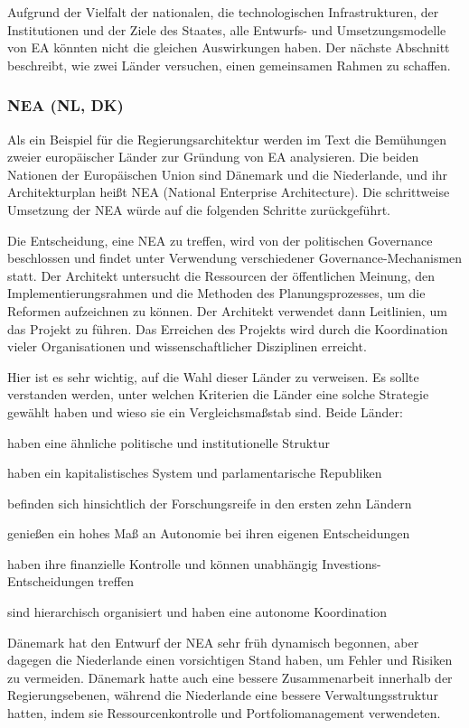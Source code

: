 \documentclass[
	doc,
	a4paper,
	helv
	]{apa6}
\begin{document}
Aufgrund der Vielfalt der nationalen, die technologischen Infrastrukturen, der Institutionen und der Ziele des Staates, alle Entwurfs- und Umsetzungsmodelle von EA könnten nicht die gleichen Auswirkungen haben. Der nächste Abschnitt beschreibt, wie zwei Länder versuchen, einen gemeinsamen Rahmen zu schaffen.

\subsubsection{NEA (NL, DK)}
Als ein Beispiel für die Regierungsarchitektur werden im Text die Bemühungen zweier europäischer Länder zur Gründung von EA analysieren. \autocite{Janssen2007} Die beiden Nationen der Europäischen Union sind Dänemark und die Niederlande, und ihr Architekturplan heißt NEA (National Enterprise Architecture). Die schrittweise Umsetzung der NEA würde auf die folgenden Schritte zurückgeführt.

Die Entscheidung, eine NEA zu treffen, wird von der politischen Governance beschlossen und findet unter Verwendung verschiedener Governance-Mechanismen statt. Der Architekt untersucht die Ressourcen der öffentlichen Meinung, den Implementierungsrahmen und die Methoden des Planungsprozesses, um die Reformen aufzeichnen zu können. Der Architekt verwendet dann Leitlinien, um das Projekt zu führen. Das Erreichen des Projekts wird durch die Koordination vieler Organisationen und wissenschaftlicher Disziplinen erreicht.

Hier ist es sehr wichtig, auf die Wahl dieser Länder zu verweisen. Es sollte verstanden werden, unter welchen Kriterien die Länder eine solche Strategie gewählt haben und wieso sie ein Vergleichsmaßstab sind.
Beide Länder:
\begin{APAitemize}
\item haben eine ähnliche politische und institutionelle Struktur
\item haben ein kapitalistisches System und parlamentarische Republiken
\item befinden sich hinsichtlich der Forschungsreife in den ersten zehn Ländern
\item genießen ein hohes Maß an Autonomie bei ihren eigenen Entscheidungen
\item haben ihre finanzielle Kontrolle und können unabhängig Investions-Entscheidungen treffen
\item sind hierarchisch organisiert und haben eine autonome Koordination
\end{APAitemize}
Dänemark hat den Entwurf der NEA sehr früh dynamisch begonnen, aber dagegen die Niederlande einen vorsichtigen Stand haben, um Fehler und Risiken zu vermeiden. Dänemark hatte auch eine bessere Zusammenarbeit innerhalb der Regierungsebenen, während die Niederlande eine bessere Verwaltungsstruktur hatten, indem sie Ressourcenkontrolle und Portfoliomanagement verwendeten.
\end{document}
